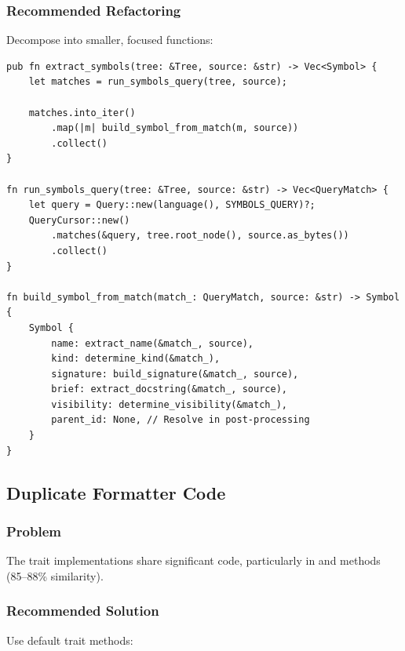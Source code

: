 \subsubsection{Recommended Refactoring}

Decompose into smaller, focused functions:

\begin{lstlisting}[style=rustcode, caption={Proposed decomposition}]
pub fn extract_symbols(tree: &Tree, source: &str) -> Vec<Symbol> {
    let matches = run_symbols_query(tree, source);
    
    matches.into_iter()
        .map(|m| build_symbol_from_match(m, source))
        .collect()
}

fn run_symbols_query(tree: &Tree, source: &str) -> Vec<QueryMatch> {
    let query = Query::new(language(), SYMBOLS_QUERY)?;
    QueryCursor::new()
        .matches(&query, tree.root_node(), source.as_bytes())
        .collect()
}

fn build_symbol_from_match(match_: QueryMatch, source: &str) -> Symbol {
    Symbol {
        name: extract_name(&match_, source),
        kind: determine_kind(&match_),
        signature: build_signature(&match_, source),
        brief: extract_docstring(&match_, source),
        visibility: determine_visibility(&match_),
        parent_id: None, // Resolve in post-processing
    }
}
\end{lstlisting}

\subsection{Duplicate Formatter Code}

\subsubsection{Problem}

The  trait implementations share significant code, particularly in  and  methods (85--88\% similarity).

\subsubsection{Recommended Solution}

Use default trait methods:

